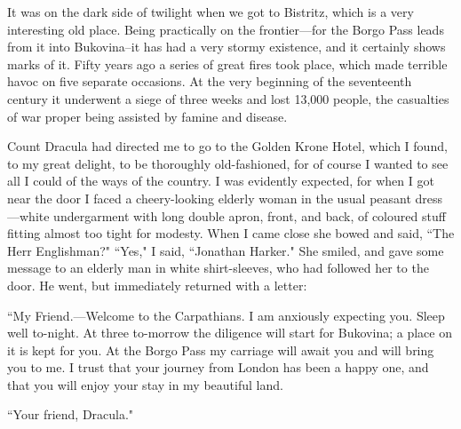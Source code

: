 It was on the dark side of twilight when we got to Bistritz, which is a very interesting old place. Being practically on the frontier---for the Borgo Pass leads from it into Bukovina--it has had a very stormy existence, and it certainly shows marks of it. Fifty years ago a series of great fires took place, which made terrible havoc on five separate occasions. At the very beginning of the seventeenth century it underwent a siege of three weeks and lost 13,000 people, the casualties of war proper being assisted by famine and disease.

Count Dracula had directed me to go to the Golden Krone Hotel, which I found, to my great delight, to be thoroughly old-fashioned, for of course I wanted to see all I could of the ways of the country. I was evidently expected, for when I got near the door I faced a cheery-looking elderly woman in the usual peasant dress---white undergarment with long double apron, front, and back, of coloured stuff fitting almost too tight for modesty. When I came close she bowed and said, ``The Herr Englishman?" ``Yes," I said, ``Jonathan Harker." She smiled, and gave some message to an elderly man in white shirt-sleeves, who had followed her to the door. He went, but immediately returned with a letter:

``My Friend.---Welcome to the Carpathians. I am anxiously expecting you. Sleep well to-night. At three to-morrow the diligence will start for Bukovina; a place on it is kept for you. At the Borgo Pass my carriage will await you and will bring you to me. I trust that your journey from London has been a happy one, and that you will enjoy your stay in my beautiful land.

``Your friend, Dracula."
